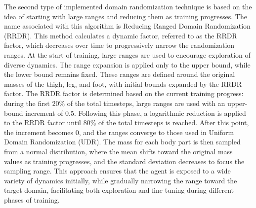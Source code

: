 \documentclass[11pt]{article}
\begin{document}
The second type of implemented domain randomization technique is based on the idea of starting with large ranges and reducing them as training progresses. The name associated with this algorithm is Reducing Ranged Domain Randomization (RRDR). This method calculates a dynamic factor, referred to as the RRDR factor, which decreases over time to progressively narrow the randomization ranges. At the start of training, large ranges are used to encourage exploration of diverse dynamics. The range expansion is applied only to the upper bound, while the lower bound remains fixed. These ranges are defined around the original masses of the thigh, leg, and foot, with initial bounds expanded by the RRDR factor. The RRDR factor is determined based on the current training progress: during the first 20\% of the total timesteps, large ranges are used with an upper-bound increment of 0.5. Following this phase, a logarithmic reduction is applied to the RRDR factor until 80\% of the total timesteps is reached. After this point, the increment becomes 0, and the ranges converge to those used in Uniform Domain Randomization (UDR). The mass for each body part is then sampled from a normal distribution, where the mean shifts toward the original mass values as training progresses, and the standard deviation decreases to focus the sampling range. This approach ensures that the agent is exposed to a wide variety of dynamics initially, while gradually narrowing the range toward the target domain, facilitating both exploration and fine-tuning during different phases of training.\\
\end{document}
